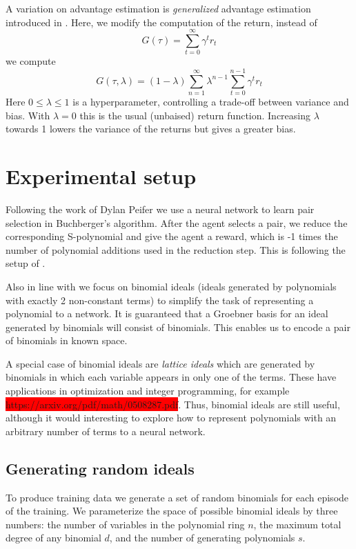 \documentclass{article}
\theoremstyle{changedot}
\theoremstyle{changedotbreak}
\theoremstyle{nonumberplain}
\begin{document}
A variation on advantage estimation is \emph{generalized} advantage estimation introduced in \cite{GAE}. Here, we modify the computation of the return, instead of \[G(\tau) = \sum_{t=0}^{\infty} \gamma^{t} r_{t}\] we compute \[G(\tau, \lambda) = (1 - \lambda)\sum_{n=1}^{\infty} \lambda^{n-1} \sum_{t=0}^{n-1} \gamma^{t} r_{t}\] Here $0 \leq \lambda \leq 1$ is a hyperparameter, controlling a trade-off between variance and bias. With $\lambda = 0$ this is the usual (unbaised) return function. Increasing $\lambda$ towards 1 lowers the variance of the returns but gives a greater bias.




\section{Experimental setup}
Following the work of Dylan Peifer \cite{peifer} we use a neural network to learn pair selection in Buchberger's algorithm. After the agent selects a pair, we reduce the corresponding S-polynomial and give the agent a reward, which is -1 times the number of polynomial additions used in the reduction step. This is following the setup of \cite{peifer}.

Also in line with \cite{peifer} we focus on binomial ideals (ideals generated by polynomials with exactly 2 non-constant terms) to simplify the task of representing a polynomial to a network. It is guaranteed that a Groebner basis for an ideal generated by binomials will consist of binomials. This enables us to encode a pair of binomials in known space.

A special case of binomial ideals are \emph{lattice ideals} which are generated by binomials in which each variable appears in only one of the terms. These have applications in optimization and integer programming, for example \colorbox{red}{https://arxiv.org/pdf/math/0508287.pdf}. Thus, binomial ideals are still useful, although it would interesting to explore how to represent polynomials with an arbitrary number of terms to a neural network.

\subsection{Generating random ideals}
To produce training data we generate a set of random binomials for each episode of the training. We parameterize the space of possible binomial ideals by three numbers: the number of variables in the polynomial ring $n$, the maximum total degree of any binomial $d$, and the number of generating polynomials $s$.
\end{document}
